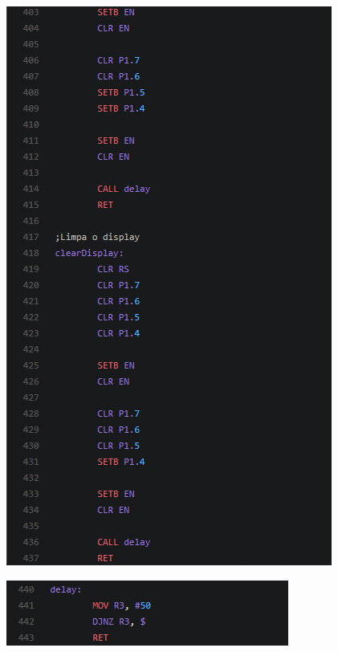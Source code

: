\documentclass{article}
\begin{document}
\begin{figure}[H]
\hspace*{-1.0in}
\includegraphics[scale=0.8]{13.PNG}
\end{figure}
\begin{figure}[H]
\hspace*{-1.0in}
\includegraphics[scale=1]{14.PNG}
\end{figure}

\newpage
\end{document}
